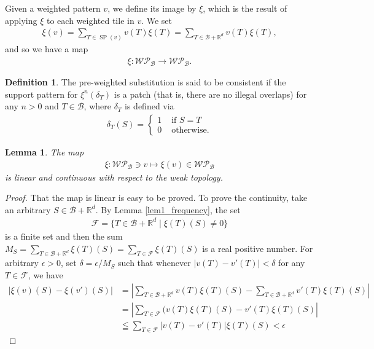 \documentclass[a4]{amsart}
\DeclareMathOperator{\SP}{SP}
\newcommand{\WP}{\mathcal{W}\mathcal{P}}
\newtheorem{lem}[theorem]{Lemma}
\theoremstyle{definition}
\newtheorem{defin}{Definition}%
\begin{document}
Given a weighted pattern $v$, we define its image by $\xi$, which is the result of applying $\xi$ to each weighted tile in $v$.
We set
\begin{align*}
 \xi(v)=\sum_{T\in\SP(v)}v(T)\xi(T)=\sum_{T\in\mathcal{B}+\mathbb{R}^d}v(T)\xi(T),
\end{align*}
and so we have a map
\begin{align*}
 \xi\colon\WP_{\mathcal{B}}\rightarrow\WP_{\mathcal{B}}.
\end{align*}
\begin{defin}\label{consistency_weighted}
    The pre-weighted substitution is said to be consistent if the support pattern for $\xi^n(\delta_T)$
    is a patch (that is, there are no illegal overlaps) for any $n>0$ and
    $T\in\mathcal{B}$,
    where $\delta_T$ is
    defined via
    \begin{align*}
        \delta_T(S)
        =\begin{cases}
            1 &\text{ if $S=T$}\\
            0 &\text{ otherwise.}
        \end{cases}
    \end{align*}
\end{defin}
\begin{lem}
 The map
\begin{align*}
 \xi\colon \WP_{\mathcal{B}}\ni v\mapsto \xi(v)\in\WP_{\mathcal{B}}
\end{align*}
is linear and continuous with respect to the weak topology.
\end{lem}
\begin{proof}
 That the map is linear is easy to be proved. To prove the continuity, 
take an arbitrary $S\in\mathcal{B}+\mathbb{R}^d$. By Lemma \ref{lem1_frequency}, the set
\begin{align*}
     \mathcal{F}=\{T\in\mathcal{B}+\mathbb{R}^d\mid \xi(T)(S)\neq 0\}
\end{align*}
is a finite set and then the sum $M_S=\sum_{T\in \mathcal{B}+\mathbb{R}^d} \xi(T)(S)=\sum_{T\in \mathcal{F}}\xi(T)(S)$ is a real positive number. For arbitrary $\epsilon>0$, set $\delta=\epsilon/M_S$ such that whenever $|v(T)-v'(T)|<\delta$ for any $T\in \mathcal{F}$, we have
\begin{align*}
    \left|\xi(v)(S)-\xi(v')(S)\right|&=\left|\sum_{T\in\mathcal{B}+\mathbb{R}^d}v(T)\xi(T)(S)-\sum_{T\in\mathcal{B}+\mathbb{R}^d}v'(T)\xi(T)(S)\right|\\
    &=\left|\sum_{T\in\mathcal{F}}(v(T)\xi(T)(S)-v'(T)\xi(T)(S)\right|\\
    &\leqq\sum_{T\in\mathcal{F}}|v(T)-v'(T)|\xi(T)(S)<\epsilon
\end{align*}
\end{proof}
\end{document}
